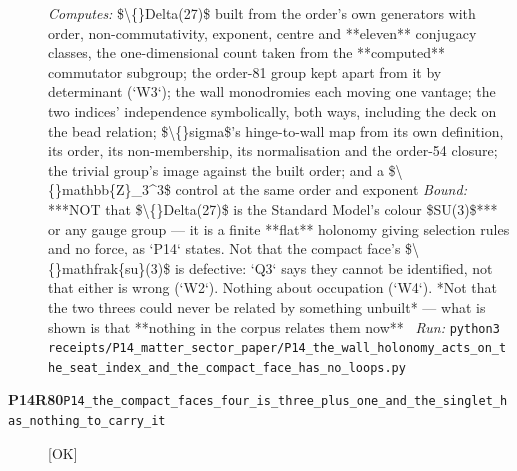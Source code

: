 \begin{description}
\emph{Computes:} \$\textbackslash\{\}Delta(27)\$ built from the order's own generators with order, non-commutativity, exponent, centre and **eleven** conjugacy classes, the one-dimensional count taken from the **computed** commutator subgroup; the order-81 group kept apart from it by determinant (`W3`); the wall monodromies each moving one vantage; the two indices' independence symbolically, both ways, including the deck on the bead relation; \$\textbackslash\{\}sigma\$'s hinge-to-wall map from its own definition, its order, its non-membership, its normalisation and the order-54 closure; the trivial group's image against the built order; and a \$\textbackslash\{\}mathbb\{Z\}\_3\textasciicircum{}3\$ control at the same order and exponent
 \emph{Bound:}  ***NOT that \$\textbackslash\{\}Delta(27)\$ is the Standard Model's colour \$SU(3)\$*** or any gauge group --- it is a finite **flat** holonomy giving selection rules and no force, as `P14` states. Not that the compact face's \$\textbackslash\{\}mathfrak\{su\}(3)\$ is defective: `Q3` says they cannot be identified, not that either is wrong (`W2`). Nothing about occupation (`W4`). *Not that the two threes could never be related by something unbuilt* --- what is shown is that **nothing in the corpus relates them now**
\ \emph{Run:} \texttt{python3 receipts/P14\_matter\_sector\_paper/P14\_the\_wall\_holonomy\_acts\_on\_the\_seat\_index\_and\_the\_compact\_face\_has\_no\_loops.py}
\item[\rcptlabel{P14_the_compact_faces_four_is_three_plus_one_and_the_singlet_has_nothing_to_carry_it}{P14R80}\textbf{P14R80}\quad\texttt{P14\_the\_compact\_faces\_four\_is\_three\_plus\_one\_and\_the\_singlet\_has\_nothing\_to\_carry\_it}]\hfill\textsf{[OK]}\\

\end{description}
